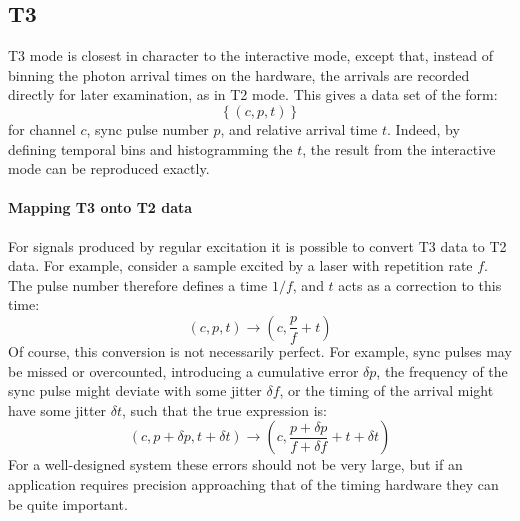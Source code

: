 \documentclass{book}
\newcommand{\braces}[1]{\ensuremath{\left\lbrace #1 \right\rbrace}}
\newcommand{\parens}[1]{\ensuremath{\left( #1 \right)}}
\newcommand{\channel}{\ensuremath{c}}
\renewcommand{\time}{\ensuremath{t}}
\newcommand{\pulse}{\ensuremath{p}}
\newcommand{\reprate}{\ensuremath{f}}
\numberwithin{equation}{section}
\numberwithin{figure}{section}
\begin{document}
\subsection{T3}
\label{sec:t3}
T3 mode is closest in character to the interactive mode, except that, instead of binning the photon arrival times on the hardware, the arrivals are recorded directly for later examination, as in T2 mode. This gives a data set of the form:
\begin{equation}
\braces{\parens{\channel, \pulse, \time}}
\end{equation}
for channel \channel{}, sync pulse number \pulse{}, and relative arrival time \time{}. Indeed, by defining temporal bins and histogramming the \time{}, the result from the interactive mode can be reproduced exactly.

\paragraph{Mapping T3 onto T2 data}
\label{sec:t3_to_t2}
For signals produced by regular excitation it is possible to convert T3 data to T2 data. For example, consider a sample excited by a laser with repetition rate \reprate. The pulse number therefore defines a time $1/\reprate$, and \time{} acts as a correction to this time:
\begin{equation}
\parens{\channel, \pulse, \time} \rightarrow \parens{\channel, \frac{\pulse}{\reprate} + \time}
\end{equation}
Of course, this conversion is not necessarily perfect. For example, sync pulses may be missed or overcounted, introducing a cumulative error $\delta\pulse$, the frequency of the sync pulse might deviate with some jitter $\delta\reprate$, or the timing of the arrival might have some jitter $\delta\time$, such that the true expression is:
\begin{equation}
\parens{\channel, \pulse + \delta\pulse, \time + \delta\time}
      \rightarrow 
\parens{\channel, \frac{\pulse+\delta\pulse}{\reprate+\delta\reprate} + \time+\delta\time}
\end{equation}
For a well-designed system these errors should not be very large, but if an application requires precision approaching that of the timing hardware they can be quite important. 

%
\end{document}
